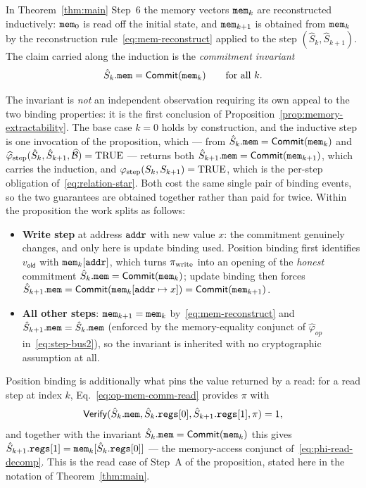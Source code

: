 \begin{remark}%
  \label{rem:mem-inheritance}
In Theorem~\ref{thm:main} Step~6 the memory vectors $\mathtt{mem}_k$ are reconstructed
inductively: $\mathtt{mem}_0$ is read off the initial state, and $\mathtt{mem}_{k+1}$ is
obtained from $\mathtt{mem}_k$ by the reconstruction rule~\eqref{eq:mem-reconstruct}
applied to the step $(\hat{S}_k,\hat{S}_{k+1})$.  The claim carried along the
induction is the \emph{commitment invariant}
\[
  \hat{S}_k.\mathtt{mem}=\mathsf{Commit}(\mathtt{mem}_k)\qquad\text{for all }k.
\]

The invariant is \emph{not} an independent observation requiring its own
appeal to the two binding properties: it is the first conclusion of
Proposition~\ref{prop:memory-extractability}.  The base case $k=0$ holds by
construction, and the inductive step is one invocation of the proposition,
which --- from $\hat{S}_k.\mathtt{mem}=\mathsf{Commit}(\mathtt{mem}_k)$ and
$\widehat{\varphi}_{\mathrm{step}}(\hat{S}_k,\hat{S}_{k+1},\widehat{\mathcal{B}})=\mathrm{TRUE}$
--- returns both $\hat{S}_{k+1}.\mathtt{mem}=\mathsf{Commit}(\mathtt{mem}_{k+1})$, which
carries the induction, and $\varphi_{\mathrm{step}}(S_k,S_{k+1})=\mathrm{TRUE}$, which
is the per-step obligation of~\eqref{eq:relation-star}.  Both cost the same
single pair of binding events, so the two guarantees are obtained together
rather than paid for twice.  Within the proposition the work splits as follows:
\begin{itemize}
  \item \textbf{Write step} at address $\mathtt{addr}$ with new value $x$: the
    commitment genuinely changes, and only here is update binding used.
    Position binding first identifies $v_{\mathsf{old}}$ with $\mathtt{mem}_k[\mathtt{addr}]$,
    which turns $\pi_{\mathrm{write}}$ into an opening of the \emph{honest} commitment
    $\hat{S}_k.\mathtt{mem}=\mathsf{Commit}(\mathtt{mem}_k)$; update binding then forces
    $\hat{S}_{k+1}.\mathtt{mem}=\mathsf{Commit}(\mathtt{mem}_k[\mathtt{addr}\mapsto x])
    =\mathsf{Commit}(\mathtt{mem}_{k+1})$.
  \item \textbf{All other steps}: $\mathtt{mem}_{k+1}=\mathtt{mem}_k$
    by~\eqref{eq:mem-reconstruct} and $\hat{S}_{k+1}.\mathtt{mem}=\hat{S}_k.\mathtt{mem}$
    (enforced by the memory-equality conjunct of $\widehat{\varphi}_{op}$
    in~\eqref{eq:step-bus2}), so the invariant is inherited with no
    cryptographic assumption at all.
\end{itemize}

Position binding is additionally what pins the value returned by a read: for a
read step at index $k$, Eq.~\eqref{eq:op-mem-comm-read} provides $\pi$ with
\[
  \mathsf{Verify}(\hat{S}_k.\mathtt{mem},\hat{S}_k.\mathtt{regs}[0],\hat{S}_{k+1}.\mathtt{regs}[1],\pi)=1,
\]
and together with the invariant $\hat{S}_k.\mathtt{mem}=\mathsf{Commit}(\mathtt{mem}_k)$ this
gives $\hat{S}_{k+1}.\mathtt{regs}[1]=\mathtt{mem}_k[\hat{S}_k.\mathtt{regs}[0]]$ --- the memory-access
conjunct of~\eqref{eq:phi-read-decomp}.  This is the read case of Step~A of the
proposition, stated here in the notation of Theorem~\ref{thm:main}.
\end{remark}

